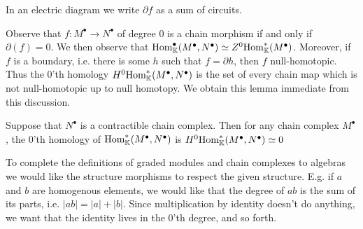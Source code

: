 \documentclass[../thesis.tex]{subfiles}
\begin{document}
            In an electric diagram we write $\partial f$ as a sum of circuits.
            \begin{center}
            \end{center}

            Observe that $f:M^{\bullet}\rightarrow N^{\bullet}$ of degree $0$ is a chain morphism if and only if $\partial(f) = 0$. We then observe that $\tt{Hom}_{\mathbb{K}}^{\bullet}(M^{\bullet},N^{\bullet})\simeq Z^0\tt{Hom}_{\mathbb{K}}^*(M^{\bullet})$. Moreover, if $f$ is a boundary, i.e. there is some $h$ such that $f = \partial h$, then $f$ null-homotopic. Thus the $0$'th homology $H^0\tt{Hom}^*_\mathbb{K}(M^\bullet, N^\bullet)$ is the set of every chain map which is not null-homotopic up to null homotopy. We obtain this lemma immediate from this discussion.

            \begin{lemma}
                Suppose that $N^\bullet$ is a contractible chain complex. Then for any chain complex $M^\bullet$, the $0$'th homology of $\tt{Hom}^*_\mathbb{K}(M^\bullet, N^\bullet)$ is $H^0\tt{Hom}^*_\mathbb{K}(M^\bullet, N^\bullet)\simeq 0$
            \end{lemma}

            To complete the definitions of graded modules and chain complexes to algebras we would like the structure morphisms to respect the given structure. E.g. if $a$ and $b$ are homogenous elements, we would like that the degree of $ab$ is the sum of its parts, i.e. $|ab| = |a| + |b|$. Since multiplication by identity doesn't do anything, we want that the identity lives in the $0$'th degree, and so forth.
\end{document}

